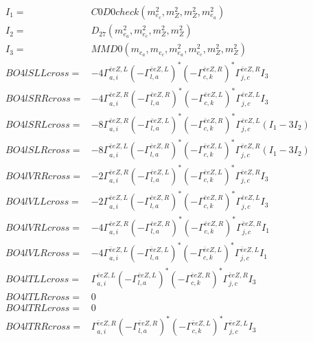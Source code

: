 \documentclass[A4,landscape]{article}
\begin{document}
\begin{align} 
I_1 = & C0D0check(m^2_{e_{{c}}}, m^2_{Z}, m^2_{Z}, m^2_{e_{{a}}}) \\ 
I_2 = & D_{27}(m^2_{e_{{a}}}, m^2_{e_{{c}}}, m^2_{Z}, m^2_{Z}) \\ 
I_3 = & MMD0(m_{e_{{a}}}, m_{e_{{c}}}, m^2_{e_{{a}}}, m^2_{e_{{c}}}, m^2_{Z}, m^2_{Z}) \\ 
  BO4lSLLcross= & -4  \Gamma^{\bar{e}e Z ,L}_{a, i} (- \Gamma^{\bar{e}e Z ,L} _{l, a})^* (- \Gamma^{\bar{e}e Z ,R} _{c, k})^* \Gamma^{\bar{e}e Z ,R}_{j, c} I_3 \\ 
  BO4lSRRcross= & -4  \Gamma^{\bar{e}e Z ,R}_{a, i} (- \Gamma^{\bar{e}e Z ,R} _{l, a})^* (- \Gamma^{\bar{e}e Z ,L} _{c, k})^* \Gamma^{\bar{e}e Z ,L}_{j, c} I_3 \\ 
  BO4lSRLcross= & -8  \Gamma^{\bar{e}e Z ,R}_{a, i} (- \Gamma^{\bar{e}e Z ,L} _{l, a})^* (- \Gamma^{\bar{e}e Z ,R} _{c, k})^* \Gamma^{\bar{e}e Z ,L}_{j, c} (I_1 - 3 I_2) \\ 
  BO4lSLRcross= & -8  \Gamma^{\bar{e}e Z ,L}_{a, i} (- \Gamma^{\bar{e}e Z ,R} _{l, a})^* (- \Gamma^{\bar{e}e Z ,L} _{c, k})^* \Gamma^{\bar{e}e Z ,R}_{j, c} (I_1 - 3 I_2) \\ 
  BO4lVRRcross= & -2  \Gamma^{\bar{e}e Z ,R}_{a, i} (- \Gamma^{\bar{e}e Z ,L} _{l, a})^* (- \Gamma^{\bar{e}e Z ,L} _{c, k})^* \Gamma^{\bar{e}e Z ,R}_{j, c} I_3 \\ 
  BO4lVLLcross= & -2  \Gamma^{\bar{e}e Z ,L}_{a, i} (- \Gamma^{\bar{e}e Z ,R} _{l, a})^* (- \Gamma^{\bar{e}e Z ,R} _{c, k})^* \Gamma^{\bar{e}e Z ,L}_{j, c} I_3 \\ 
  BO4lVRLcross= & -4  \Gamma^{\bar{e}e Z ,R}_{a, i} (- \Gamma^{\bar{e}e Z ,R} _{l, a})^* (- \Gamma^{\bar{e}e Z ,R} _{c, k})^* \Gamma^{\bar{e}e Z ,R}_{j, c} I_1 \\ 
  BO4lVLRcross= & -4  \Gamma^{\bar{e}e Z ,L}_{a, i} (- \Gamma^{\bar{e}e Z ,L} _{l, a})^* (- \Gamma^{\bar{e}e Z ,L} _{c, k})^* \Gamma^{\bar{e}e Z ,L}_{j, c} I_1 \\ 
  BO4lTLLcross= &  \Gamma^{\bar{e}e Z ,L}_{a, i} (- \Gamma^{\bar{e}e Z ,L} _{l, a})^* (- \Gamma^{\bar{e}e Z ,R} _{c, k})^* \Gamma^{\bar{e}e Z ,R}_{j, c} I_3 \\ 
  BO4lTLRcross= & 0 \\ 
  BO4lTRLcross= & 0 \\ 
  BO4lTRRcross= &  \Gamma^{\bar{e}e Z ,R}_{a, i} (- \Gamma^{\bar{e}e Z ,R} _{l, a})^* (- \Gamma^{\bar{e}e Z ,L} _{c, k})^* \Gamma^{\bar{e}e Z ,L}_{j, c} I_3 \\ 
\end{align} 
\end{document}
